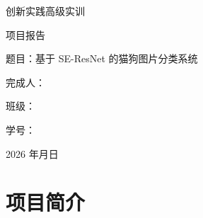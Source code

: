 \documentclass[12pt,a4paper]{ctexart}
\begin{document}
\begin{titlepage}
    \thispagestyle{empty}
    \begin{center}
        \vspace*{2cm}

        {\heiti{} 创新实践高级实训}

        \vspace{1.5cm}

        {\heiti{} 项\hspace{2em}目\hspace{2em}报\hspace{2em}告}

        \vspace{3cm}

        {\kaishu{}
            题\hspace{1.5em}目：基于 SE-ResNet 的猫狗图片分类系统

            \vspace{1.5cm}

            完成人：\hspace{5em}

            \vspace{1cm}

            班\hspace{1.5em}级：\hspace{5em}

            \vspace{1cm}

            学\hspace{1.5em}号：\hspace{5em}
        }

        \vspace{3cm}

        {\songti{} 2026 年\hspace{2em}月\hspace{2em}日}

    \end{center}
\end{titlepage}

\tableofcontents
\thispagestyle{empty}
\newpage


\section{项目简介}
\end{document}
